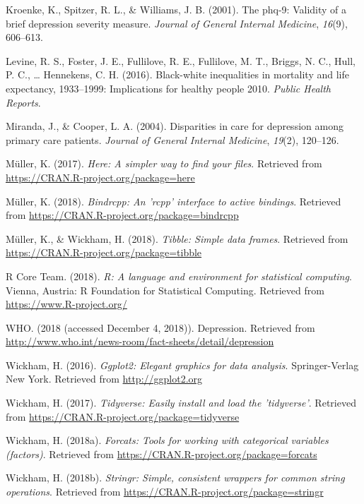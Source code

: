 \documentclass[man]{apa6}
\begin{document}
\hypertarget{ref-kroenke2001phq}{}
Kroenke, K., Spitzer, R. L., \& Williams, J. B. (2001). The phq-9:
Validity of a brief depression severity measure. \emph{Journal of
General Internal Medicine}, \emph{16}(9), 606--613.

\hypertarget{ref-levine2016black}{}
Levine, R. S., Foster, J. E., Fullilove, R. E., Fullilove, M. T.,
Briggs, N. C., Hull, P. C., \ldots{} Hennekens, C. H. (2016).
Black-white inequalities in mortality and life expectancy, 1933--1999:
Implications for healthy people 2010. \emph{Public Health Reports}.

\hypertarget{ref-miranda2004disparities}{}
Miranda, J., \& Cooper, L. A. (2004). Disparities in care for depression
among primary care patients. \emph{Journal of General Internal
Medicine}, \emph{19}(2), 120--126.

\hypertarget{ref-R-here}{}
Müller, K. (2017). \emph{Here: A simpler way to find your files}.
Retrieved from \url{https://CRAN.R-project.org/package=here}

\hypertarget{ref-R-bindrcpp}{}
Müller, K. (2018). \emph{Bindrcpp: An 'rcpp' interface to active
bindings}. Retrieved from
\url{https://CRAN.R-project.org/package=bindrcpp}

\hypertarget{ref-R-tibble}{}
Müller, K., \& Wickham, H. (2018). \emph{Tibble: Simple data frames}.
Retrieved from \url{https://CRAN.R-project.org/package=tibble}

\hypertarget{ref-R-base}{}
R Core Team. (2018). \emph{R: A language and environment for statistical
computing}. Vienna, Austria: R Foundation for Statistical Computing.
Retrieved from \url{https://www.R-project.org/}

\hypertarget{ref-who}{}
WHO. (2018 (accessed December 4, 2018)). Depression. Retrieved from
\url{http://www.who.int/news-room/fact-sheets/detail/depression}

\hypertarget{ref-R-ggplot2}{}
Wickham, H. (2016). \emph{Ggplot2: Elegant graphics for data analysis}.
Springer-Verlag New York. Retrieved from \url{http://ggplot2.org}

\hypertarget{ref-R-tidyverse}{}
Wickham, H. (2017). \emph{Tidyverse: Easily install and load the
'tidyverse'}. Retrieved from
\url{https://CRAN.R-project.org/package=tidyverse}

\hypertarget{ref-R-forcats}{}
Wickham, H. (2018a). \emph{Forcats: Tools for working with categorical
variables (factors)}. Retrieved from
\url{https://CRAN.R-project.org/package=forcats}

\hypertarget{ref-R-stringr}{}
Wickham, H. (2018b). \emph{Stringr: Simple, consistent wrappers for
common string operations}. Retrieved from
\url{https://CRAN.R-project.org/package=stringr}
\end{document}
